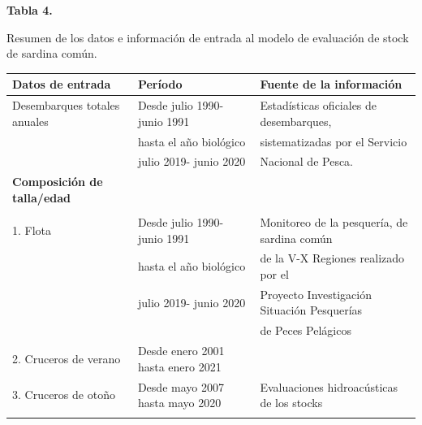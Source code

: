 \documentclass[
  spanish,
]{article}
\begin{document}
\small
\begin{center} 
\textbf{Tabla 4.}
\end{center}
\begin{center} 
\vspace{-0.2cm} Resumen de los datos e información de entrada al modelo de evaluación de stock de sardina común.
\end{center}
\vspace{-0.2cm}

\begin{table}[h]
    \centering
    \resizebox{16cm}{!} {
    \begin{tabular}{|l|l|l|}
    \hline
Datos de entrada             & Período                            & Fuente de la información                \\ \hline
Desembarques totales anuales & Desde julio 1990- junio 1991       & Estadísticas oficiales de desembarques,  \\ 
                             & hasta el año biológico             & sistematizadas por el Servicio            \\ 
                             & julio 2019- junio 2020             & Nacional de Pesca.                         \\ \hline
\textbf{Composición de talla/edad} &                              &                                             \\
                             &                                    & \\
1. Flota                     & Desde julio 1990- junio 1991       & Monitoreo de la pesquería, de sardina común  \\
                             & hasta el año biológico             & de la V-X Regiones realizado por el           \\
                             & julio 2019- junio 2020             & Proyecto Investigación Situación Pesquerías    \\
                             &                                    & de Peces Pelágicos                              \\ 
2. Cruceros de verano        & Desde enero 2001 hasta enero 2021  &                                             \\
3. Cruceros de otoño         & Desde mayo 2007 hasta mayo 2020    & Evaluaciones hidroacústicas de los stocks    \\
                             &                                    & \\

\end{tabular}}
\end{table}
\end{document}
